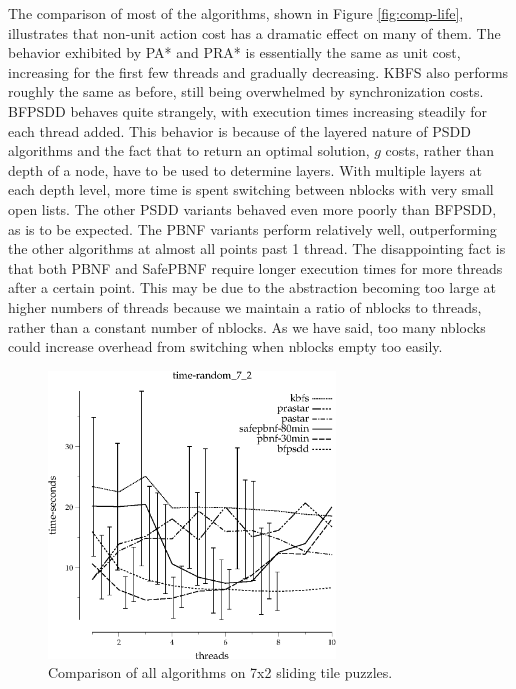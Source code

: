 \documentclass{article}
\begin{document}
The comparison of most of the algorithms, shown in Figure \ref{fig:comp-life}, illustrates that non-unit action cost has a dramatic effect on many of them. The behavior exhibited by PA* and PRA* is essentially the same as unit cost, increasing for the first few threads and gradually decreasing. KBFS also performs roughly the same as before, still being overwhelmed by synchronization costs. BFPSDD behaves quite strangely, with execution times increasing steadily for each thread added. This behavior is because of the layered nature of PSDD algorithms and the fact that to return an optimal solution, $g$ costs, rather than depth of a node, have to be used to determine layers. With multiple layers at each depth level, more time is spent switching between nblocks with very small open lists. The other PSDD variants behaved even more poorly than BFPSDD, as is to be expected. The PBNF variants perform relatively well, outperforming the other algorithms at almost all points past 1 thread. The disappointing fact is that both PBNF and SafePBNF require longer execution times for more threads after a certain point. This may be due to the abstraction becoming too large at higher numbers of threads because we maintain a ratio of nblocks to threads, rather than a constant number of nblocks. As we have said, too many nblocks could increase overhead from switching when nblocks empty too easily.

\begin{figure}[h!]
\includegraphics[width=3in]{../graphs/seth/time-random_7_2.eps}
\caption{Comparison of all algorithms on 7x2 sliding tile puzzles.}
\label{fig:comp-tile}
\end{figure}
\end{document}
